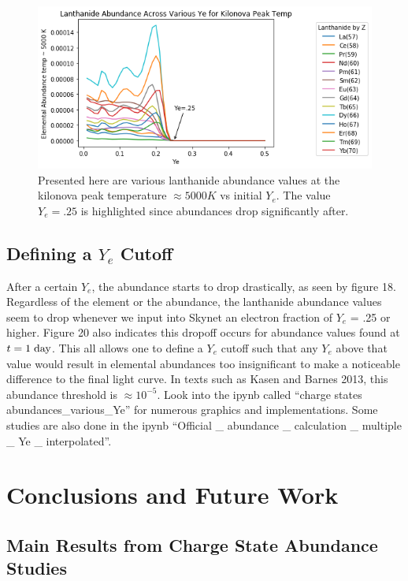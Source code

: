 \documentclass[11pt,a4paper]{article}
\begin{document}
\begin{figure}[h!]
  \includegraphics[scale = .6]{abun_vs_ye_temp.png}
  \centering
  \caption{Presented here are various lanthanide abundance values at the kilonova peak temperature  $\approx 5000K$ vs initial $Y_e$. The value $Y_e = .25$ is highlighted since abundances drop significantly after.}
\end{figure} 

\pagebreak 

\subsection{Defining a $Y_e$ Cutoff}

After a certain $Y_e$, the abundance starts to drop drastically, as seen by figure 18. Regardless of the element or the abundance, the lanthanide abundance values seem to drop whenever we input into Skynet an electron fraction of $Y_e$ = .25 or higher. Figure 20 also indicates this dropoff occurs for abundance values found at $t = \mathrm{1 \hspace{1 mm} day}$. This all allows one to define a $Y_e$ cutoff such that any $Y_e$ above that value would result in elemental abundances too insignificant to make a noticeable difference to the final light curve. In texts such as Kasen and Barnes 2013, this abundance threshold is $\approx 10^{-5}$.  
Look into the ipynb called “charge states abundances\_various\_Ye” for numerous graphics and implementations. Some studies are also done in the ipynb “Official \_ abundance \_ calculation \_ multiple \_ Ye \_ interpolated”. 

\section{Conclusions and Future Work}

\subsection{Main Results from Charge State Abundance Studies}
\end{document}
